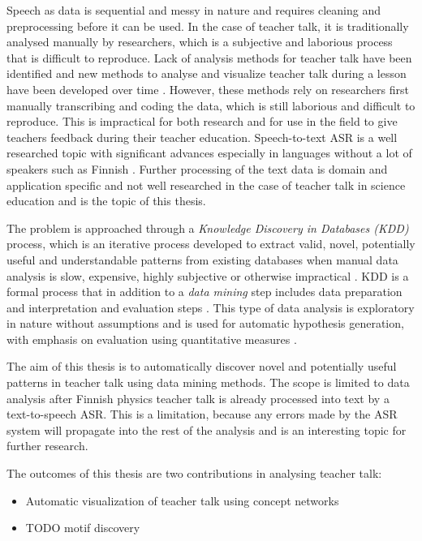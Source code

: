 \documentclass[utf8,english]{gradu3}
\begin{document}
Speech as data is sequential and messy in nature and requires cleaning and preprocessing before it can be used. In the case of teacher talk, it is traditionally analysed manually by researchers, which is a subjective and laborious process that is difficult to reproduce. Lack of analysis methods for teacher talk have been identified and new methods to analyse and visualize teacher talk during a lesson have been developed over time \parencite{viiriTeacherTalkPatterns2006,lehesvuoriVisualizingCommunicationStructures2013}. However, these methods rely on researchers first manually transcribing and coding the data, which is still laborious and difficult to reproduce. This is impractical for both research and for use in the field to give teachers feedback during their teacher education. Speech-to-text ASR is a well researched topic with significant advances especially in languages without a lot of speakers such as Finnish \parencite{kurimoModelingUnderresourcedLanguages2017}. Further processing of the text data is domain and application specific and not well researched in the case of teacher talk in science education and is the topic of this thesis. 

The problem is approached through a \emph{Knowledge Discovery in Databases (KDD)} process, which is an iterative process developed to extract valid, novel, potentially useful and understandable patterns from existing databases when manual data analysis is slow, expensive, highly subjective or otherwise impractical \parencite{fayyadKDDProcessExtracting1996}. KDD is a formal process that in addition to a \emph{data mining} step includes data preparation and interpretation and evaluation steps \parencite{fayyadKDDProcessExtracting1996}. This type of data analysis is exploratory in nature without assumptions and is used for automatic hypothesis generation, with emphasis on evaluation using quantitative measures \parencite{fayyadKDDProcessExtracting1996}.

The aim of this thesis is to automatically discover novel and potentially useful patterns in teacher talk using data mining methods. The scope is limited to data analysis after Finnish physics teacher talk is already processed into text by a text-to-speech ASR. This is a limitation, because any errors made by the ASR system will propagate into the rest of the analysis and is an interesting topic for further research.

The outcomes of this thesis are two contributions in analysing teacher talk:

\begin{itemize}
  \item Automatic visualization of teacher talk using concept networks
  \item TODO motif discovery
\end{itemize}
\end{document}
